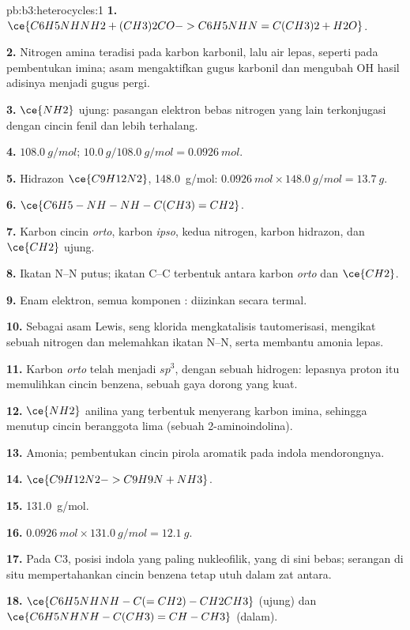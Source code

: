 \begin{solution}{pb:b3:heterocycles:1}
\textbf{1.} $\ce{C6H5NHNH2 + (CH3)2CO -> C6H5NHN=C(CH3)2 + H2O}$.

\textbf{2.} Nitrogen amina teradisi pada karbon karbonil, lalu air lepas, seperti pada
pembentukan imina; asam mengaktifkan gugus karbonil dan mengubah OH hasil adisinya
menjadi gugus pergi.

\textbf{3.} $\ce{NH2}$ ujung: pasangan elektron bebas nitrogen yang lain terkonjugasi dengan
cincin fenil dan lebih terhalang.

\textbf{4.} $\qty{108.0}{g/mol}$; $\qty{10.0}{g}/\qty{108.0}{g/mol} = \qty{0.0926}{mol}$.

\textbf{5.} Hidrazon $\ce{C9H12N2}$, \qty{148.0}{g/mol}: $\qty{0.0926}{mol} \times \qty{148.0}{g/mol} = \qty{13.7}{g}$.

\textbf{6.} $\ce{C6H5-NH-NH-C(CH3)=CH2}$.

\textbf{7.} Karbon cincin \textit{orto}, karbon \textit{ipso}, kedua nitrogen, karbon hidrazon,
dan $\ce{CH2}$ ujung.

\textbf{8.} Ikatan N--N putus; ikatan C--C terbentuk antara karbon \textit{orto} dan $\ce{CH2}$.

\textbf{9.} Enam elektron, semua komponen : diizinkan secara termal.

\textbf{10.} Sebagai asam Lewis, seng klorida mengkatalisis tautomerisasi, mengikat sebuah nitrogen dan
melemahkan ikatan N--N, serta membantu amonia lepas.

\textbf{11.} Karbon \textit{orto} telah menjadi $sp^3$, dengan sebuah hidrogen: lepasnya proton itu
memulihkan cincin benzena, sebuah gaya dorong yang kuat.

\textbf{12.} $\ce{NH2}$ anilina yang terbentuk menyerang karbon imina, sehingga menutup
cincin beranggota lima (sebuah 2-aminoindolina).

\textbf{13.} Amonia; pembentukan cincin pirola aromatik pada indola mendorongnya.

\textbf{14.} $\ce{C9H12N2 -> C9H9N + NH3}$.

\textbf{15.} \qty{131.0}{g/mol}.

\textbf{16.} $\qty{0.0926}{mol} \times \qty{131.0}{g/mol} = \qty{12.1}{g}$.

\textbf{17.} Pada C3, posisi indola yang paling nukleofilik, yang di sini bebas; serangan di situ
mempertahankan cincin benzena tetap utuh dalam zat antara.

\textbf{18.} $\ce{C6H5NHNH-C(=CH2)-CH2CH3}$ (ujung) dan $\ce{C6H5NHNH-C(CH3)=CH-CH3}$ (dalam).


\end{solution}
